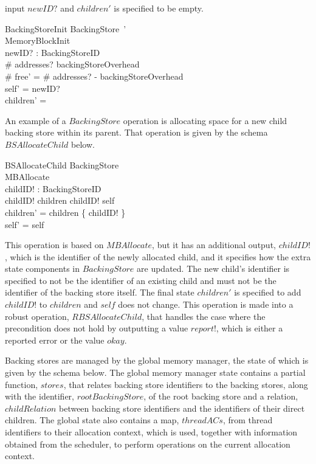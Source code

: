 \documentclass[a4paper,10pt]{report}
\begin{document}
input $newID?$ and $children'$ is specified to be empty.
\begin{schema}{BackingStoreInit}
  BackingStore~' \\
  MemoryBlockInit \\
  newID?
  : BackingStoreID \\
  \where \# addresses?
  \geq backingStoreOverhead \\
  \# free' = \# addresses?
  - backingStoreOverhead \\
  self' = newID?
  \\
  children' = \emptyset \\
\end{schema}
%
An example of a $BackingStore$ operation is allocating space for a new
child backing store within its parent.
That operation is given by the schema $BSAllocateChild$ below.
%
\begin{schema}{BSAllocateChild}
  \Delta BackingStore \\
  MBAllocate \\
  childID!
  : BackingStoreID \\
  \where childID!
  \notin children \land childID!
  \neq self \\
  children' = children \cup \{ childID!
  \} \\
  self' = self
\end{schema}
%
This operation is based on $MBAllocate$, but it has an additional
output, $childID!$, which is the identifier of the newly allocated
child, and it specifies how the extra state components in
$BackingStore$ are updated.
The new child's identifier is specified to not be the identifier of an
existing child and must not be the identifier of the backing store
itself.
The final state $children'$ is specified to add $childID!$ to
$children$ and $self$ does not change.
This operation is made into a robust operation, $RBSAllocateChild$,
that handles the case where the precondition does not hold by
outputting a value $report!$, which is either a reported error or the
value $okay$.

Backing stores are managed by the global memory manager, the state of
which is given by the schema below.
The global memory manager state contains a partial function, $stores$,
that relates backing store identifiers to the backing stores, along
with the identifier, $rootBackingStore$, of the root backing store and
a relation, $childRelation$ between backing store identifiers and the
identifiers of their direct children.
The global state also contains a map, $threadACs$, from thread
identifiers to their allocation context, which is used, together with
information obtained from the scheduler, to perform operations on the
current allocation context.
\end{document}
